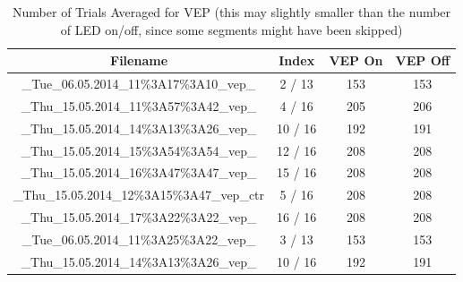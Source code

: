 \documentclass[]{article}
\begin{document}
\begin{table}[H]
\begin{center}
\begin{tabular}{cc|cc}
Filename & Index & VEP On & VEP Off \\
\hline
\_Tue\_06.05.2014\_11\%3A17\%3A10\_vep\_ & 2 / 13 & 153 & 153 \\
\_Thu\_15.05.2014\_11\%3A57\%3A42\_vep\_ & 4 / 16 & 205 & 206 \\
\_Thu\_15.05.2014\_14\%3A13\%3A26\_vep\_ & 10 / 16 & 192 & 191 \\
\_Thu\_15.05.2014\_15\%3A54\%3A54\_vep\_ & 12 / 16 & 208 & 208 \\
\_Thu\_15.05.2014\_16\%3A47\%3A47\_vep\_ & 15 / 16 & 208 & 208 \\
\_Thu\_15.05.2014\_12\%3A15\%3A47\_vep\_ctr & 5 / 16 & 208 & 208 \\
\_Thu\_15.05.2014\_17\%3A22\%3A22\_vep\_ & 16 / 16 & 208 & 208 \\
\_Tue\_06.05.2014\_11\%3A25\%3A22\_vep\_ & 3 / 13 & 153 & 153 \\
\_Thu\_15.05.2014\_14\%3A13\%3A26\_vep\_ & 10 / 16 & 192 & 191
\end{tabular}
\end{center}
\caption{Number of Trials Averaged for VEP (this may slightly smaller than the number of LED on/off, since some segments might have been skipped)}
\end{table}
\end{document}
